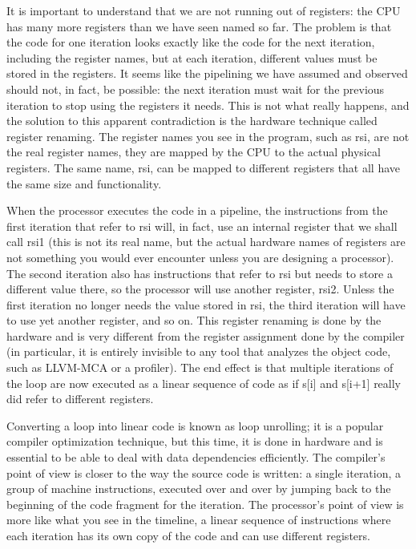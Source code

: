 It is important to understand that we are not running out of registers: the CPU has many more registers than we have seen named so far. The problem is that the code for one iteration looks exactly like the code for the next iteration, including the register names, but at each iteration, different values must be stored in the registers. It seems like the pipelining we have assumed and observed should not, in fact, be possible: the next iteration must wait for the previous iteration to stop using the registers it needs. This is not what really happens, and the solution to this apparent contradiction is the hardware technique called register renaming. The register names you see in the program, such as rsi, are not the real register names, they are mapped by the CPU to the actual physical registers. The same name, rsi, can be mapped to different registers that all have the same size and functionality.

When the processor executes the code in a pipeline, the instructions from the first iteration that refer to rsi will, in fact, use an internal register that we shall call rsi1 (this is not its real name, but the actual hardware names of registers are not something you would ever encounter unless you are designing a processor). The second iteration also has instructions that refer to rsi but needs to store a different value there, so the processor will use another register, rsi2. Unless the first iteration no longer needs the value stored in rsi, the third iteration will have to use yet another register, and so on. This register renaming is done by the hardware and is very different from the register assignment done by the compiler (in particular, it is entirely invisible to any tool that analyzes the object code, such as LLVM-MCA or a profiler). The end effect is that multiple iterations of the loop are now executed as a linear sequence of code as if s[i] and s[i+1] really did refer to different registers.

Converting a loop into linear code is known as loop unrolling; it is a popular compiler optimization technique, but this time, it is done in hardware and is essential to be able to deal with data dependencies efficiently. The compiler's point of view is closer to the way the source code is written: a single iteration, a group of machine instructions, executed over and over by jumping back to the beginning of the code fragment for the iteration. The processor's point of view is more like what you see in the timeline, a linear sequence of instructions where each iteration has its own copy of the code and can use different registers. 

